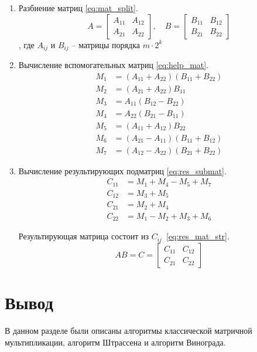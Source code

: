 \begin{enumerate}
	\item Разбиение матриц \eqref{eq:mat_split}.
	\begin{equation}
		\label{eq:mat_split}
	A = \begin{bmatrix} A_{11} & A_{12} \\ A_{21} & A_{22} \end{bmatrix}, \quad
	B = \begin{bmatrix} B_{11} & B_{12} \\ B_{21} & B_{22} \end{bmatrix}
	\end{equation}, где $A_{ij}$ и $B_{ij}$ -- матрицы порядка $m \cdot 2^{k}$
	
	\item Вычисление вспомогательных матриц \eqref{eq:help_mat}.
	\begin{equation}
		\label{eq:help_mat}
	\begin{aligned}
		M_1 &= (A_{11} + A_{22})(B_{11} + B_{22}) \\
		M_2 &= (A_{21} + A_{22})B_{11} \\
		M_3 &= A_{11}(B_{12} - B_{22}) \\
		M_4 &= A_{22}(B_{21} - B_{11}) \\
		M_5 &= (A_{11} + A_{12})B_{22} \\
		M_6 &= (A_{21} - A_{11})(B_{11} + B_{12}) \\
		M_7 &= (A_{12} - A_{22})(B_{21} + B_{22})
	\end{aligned}
	\end{equation}
	
	\item Вычисление результирующих подматриц \eqref{eq:res_submat}.
	\begin{equation}
		\label{eq:res_submat}
	\begin{aligned}
		C_{11} &= M_1 + M_4 - M_5 + M_7 \\
		C_{12} &= M_3 + M_5 \\
		C_{21} &= M_2 + M_4 \\
		C_{22} &= M_1 - M_2 + M_3 + M_6
	\end{aligned}
	\end{equation}
		
	Результирующая матрица состоит из $C_{ij}$~\eqref{eq:res_mat_str}.
	\begin{equation}
		\label{eq:res_mat_str}
		AB = C = \begin{bmatrix} C_{11} & C_{12} \\ C_{21} & C_{22} \end{bmatrix}
	\end{equation}
		
\end{enumerate}


\section*{Вывод}
В данном разделе были описаны алгоритмы классической матричной мультипликации, алгоритм Штрассена и алгоритм Винограда.